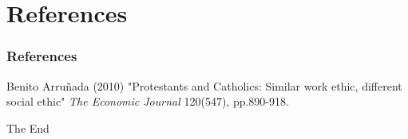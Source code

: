 \documentclass[pdftex,12pt,xcolor=pdftex,table]{beamer}
\begin{document}
\section{References}
\begin{frame}
\frametitle{References}
\footnotesize{
\begin{thebibliography}{99} 
 Benito Arruñada (2010)
\newblock  "Protestants and Catholics: Similar work ethic, different social ethic"
\newblock \emph{The Economic Journal} 120(547), pp.890-918.
\end{thebibliography}
}
\end{frame}
\begin{frame}
\Huge{\centerline{The End}}
\end{frame}
\end{document}
